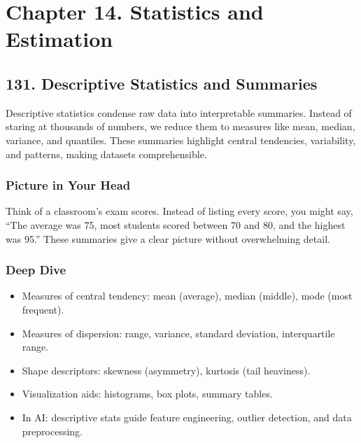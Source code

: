 \documentclass[
  letterpaper,
  DIV=11,
  numbers=noendperiod]{scrreprt}
\providecommand{\tightlist}{%
  \setlength{\itemsep}{0pt}\setlength{\parskip}{0pt}}
\begin{document}
\section{Chapter 14. Statistics and
Estimation}\label{chapter-14.-statistics-and-estimation}

\subsection{131. Descriptive Statistics and
Summaries}\label{descriptive-statistics-and-summaries}

Descriptive statistics condense raw data into interpretable summaries.
Instead of staring at thousands of numbers, we reduce them to measures
like mean, median, variance, and quantiles. These summaries highlight
central tendencies, variability, and patterns, making datasets
comprehensible.

\subsubsection{Picture in Your Head}\label{picture-in-your-head-130}

Think of a classroom's exam scores. Instead of listing every score, you
might say, ``The average was 75, most students scored between 70 and 80,
and the highest was 95.'' These summaries give a clear picture without
overwhelming detail.

\subsubsection{Deep Dive}\label{deep-dive-130}

\begin{itemize}
\tightlist
\item
  Measures of central tendency: mean (average), median (middle), mode
  (most frequent).
\item
  Measures of dispersion: range, variance, standard deviation,
  interquartile range.
\item
  Shape descriptors: skewness (asymmetry), kurtosis (tail heaviness).
\item
  Visualization aids: histograms, box plots, summary tables.
\item
  In AI: descriptive stats guide feature engineering, outlier detection,
  and data preprocessing.
\end{itemize}
\end{document}

